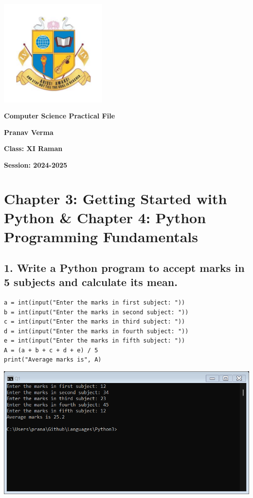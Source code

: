 \documentclass[12pt]{article}
\begin{document}
\begin{titlepage}
    \includegraphics[width=0.4\textwidth]{logo/lvis-logo.png}
    \centering
    \vspace*{2cm}

    \Huge\textbf{Computer Science Practical File}

    \vspace{1cm}
    \LARGE\textbf{Pranav Verma}

    \vfill

    \Large\textbf{Class: XI Raman}

    \vspace{2cm}

    \Large\textbf{Session: 2024-2025}
\end{titlepage}

\tableofcontents


\section*{Chapter 3: Getting Started with Python \& Chapter 4: Python Programming Fundamentals}

\subsection*{1. Write a Python program to accept marks in 5 subjects and calculate its mean.}
\begin{verbatim}
a = int(input("Enter the marks in first subject: "))
b = int(input("Enter the marks in second subject: "))
c = int(input("Enter the marks in third subject: "))
d = int(input("Enter the marks in fourth subject: "))
e = int(input("Enter the marks in fifth subject: "))
A = (a + b + c + d + e) / 5
print("Average marks is", A)
\end{verbatim}
\includegraphics[width=\linewidth]{images/1.png}
\end{document}
